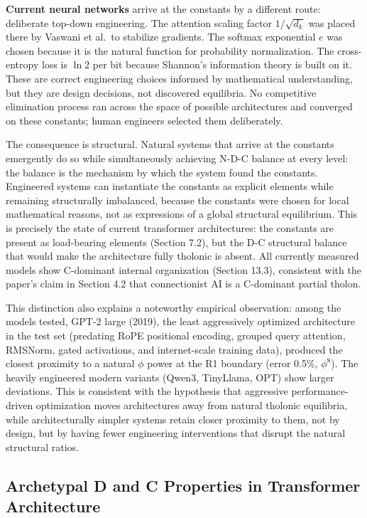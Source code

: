 \documentclass[12pt]{article}
\begin{document}
\textbf{Current neural networks} arrive at the constants by a different
route: deliberate top-down engineering. The attention scaling factor
\(1/\sqrt{d_k}\) was placed there by Vaswani et al.~to stabilize
gradients. The softmax exponential \(e\) was chosen because it is the
natural function for probability normalization. The cross-entropy loss
is \(\ln 2\) per bit because Shannon's information theory is built on
it. These are correct engineering choices informed by mathematical
understanding, but they are design decisions, not discovered equilibria.
No competitive elimination process ran across the space of possible
architectures and converged on these constants; human engineers selected
them deliberately.

The consequence is structural. Natural systems that arrive at the
constants emergently do so while simultaneously achieving N-D-C balance
at every level: the balance is the mechanism by which the system found
the constants. Engineered systems can instantiate the constants as
explicit elements while remaining structurally imbalanced, because the
constants were chosen for local mathematical reasons, not as expressions
of a global structural equilibrium. This is precisely the state of
current transformer architectures: the constants are present as
load-bearing elements (Section 7.2), but the D-C structural balance that
would make the architecture fully tholonic is absent. All currently
measured models show C-dominant internal organization (Section 13.3),
consistent with the paper's claim in Section 4.2 that connectionist AI
is a C-dominant partial tholon.

This distinction also explains a noteworthy empirical observation: among
the models tested, GPT-2 large (2019), the least aggressively optimized
architecture in the test set (predating RoPE positional encoding,
grouped query attention, RMSNorm, gated activations, and internet-scale
training data), produced the closest proximity to a natural \(\phi\)
power at the R1 boundary (error 0.5\%, \(\phi^8\)). The heavily
engineered modern variants (Qwen3, TinyLlama, OPT) show larger
deviations. This is consistent with the hypothesis that aggressive
performance-driven optimization moves architectures away from natural
tholonic equilibria, while architecturally simpler systems retain closer
proximity to them, not by design, but by having fewer engineering
interventions that disrupt the natural structural ratios.

\subsection{Archetypal D and C Properties in Transformer Architecture}\label{archetypal-d-and-c-properties-in-transformer-architecture}
\end{document}
